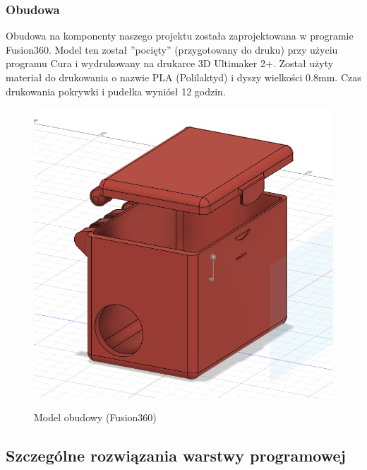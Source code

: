 \documentclass[12pt]{article}
\begin{document}
\subsubsection{Obudowa}
Obudowa na komponenty naszego projektu została zaprojektowana w programie Fusion360. Model ten został ''pocięty'' (przygotowany do druku) przy użyciu programu Cura i wydrukowany na drukarce 3D Ultimaker 2+. Został użyty materiał do drukowania o nazwie PLA (Polilaktyd) i dyszy wielkości 0.8mm. Czas drukowania pokrywki i pudełka wyniósł 12 godzin.

\begin{figure}[!h]
	\begin{center}
		{\includegraphics[width=12cm]{obudowa_model.png}}
	\end{center}
	\caption{Model obudowy (Fusion360)}
\end{figure}

\subsection{Szczególne rozwiązania warstwy programowej}
\end{document}
